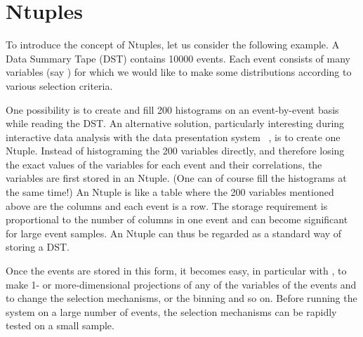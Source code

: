 %

\newcommand{\RWN}{RWN\index{Ntuple!Row-Wise-Ntuple}}
\newcommand{\CWN}{CWN\index{Ntuple!Column-Wise-Ntuple}}

\chapter{Ntuples}
\label{HNTUPLE}

To introduce the concept of Ntuples, let us consider
the following example.
A Data Summary Tape (DST) contains 10000 events.
Each event consists of many variables (say )
for which we would like to make some distributions
according to various selection criteria.

One possibility is to create and fill 200 histograms
on an event-by-event basis while reading the DST.
An alternative solution, particularly interesting
during interactive data analysis with
the data presentation system \PAW~\cite{bib-PAW},
is to create one Ntuple.
Instead of histograming the 200 variables directly, and therefore
losing the exact values of the variables
for each event and their correlations,
the variables are first stored in an Ntuple.
(One can of course fill the histograms at the same time!)
An Ntuple is like a table where the 200 variables
mentioned above are the columns and each event is a row.
The storage requirement is proportional
to the number of columns in one event and can become
significant for large event samples.
An Ntuple can thus be regarded as a standard way of storing a DST.

Once the events are stored in this form, it becomes easy, in
particular with \PAW{},
to make 1- or more-dimensional projections of any of the 
variables of the events and to change the selection
mechanisms, or the binning and so on.
Before running the system on a large
number of events, the selection mechanisms can be rapidly tested
on a small sample.

